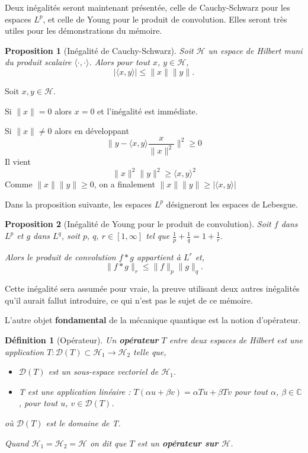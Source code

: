 \documentclass[a4paper, 12pt]{report}
\newcommand{\ra}[1][]{\overset{#1}{\rightarrow}} %
\renewcommand{\.}{\cdot} %
\theoremstyle{break}
\newtheorem{definition}{Définition}
\newtheorem{proposition}{Proposition}
\theoremstyle{remark}
\theoremstyle{proofstyle}
\begin{document}
Deux inégalités seront maintenant présentée, celle de Cauchy-Schwarz pour les espaces $L^p$, et celle de Young pour le produit de convolution. Elles seront très utiles pour les démonstrations du mémoire.

\begin{proposition}[Inégalité de Cauchy-Schwarz]
    Soit $\mathcal{H}$ un espace de Hilbert muni du produit scalaire $\langle \., \. \rangle$. Alors pour tout $x$, $y \in \mathcal{H}$,
    $$| \langle x, y \rangle | \leq \| x \| \| y \|.$$
\end{proposition}

\begin{preuve}
    Soit $x, y \in \mathcal{H}$.

    Si $\| x \| = 0$ alors $x=0$ et l'inégalité est immédiate.

    Si $\| x\| \neq 0$ alors en développant
    $$\|y-\langle x, y \rangle \frac{x}{\|x\|^2}\|^2 \geq 0$$
    Il vient
    $$\|x\|^2\|y\|^2 \geq \langle x, y \rangle ^2$$
    Comme $\|x\| \|y\| \geq 0$, on a finalement $\|x\| \|y\| \geq |\langle x, y\rangle|$
\end{preuve}

Dans la proposition suivante, les espaces $L^p$ désigneront les espaces de Lebesgue.

\begin{proposition}[Inégalité de Young pour le produit de convolution]
    Soit $f$ dans $L^p$ et $g$ dans $L^q$, soit $p, ~q,~r \in [1, \infty ]$ tel que $\frac{1}{p} + \frac{1}{q} = 1 + \frac{1}{r}.$

    Alors le produit de convolution $f * g$ appartient à $L^r$ et,
    $$\|f * g\|_r \leq \|f\|_p\|g\|_q.$$
\end{proposition}

Cette inégalité sera assumée pour vraie, la preuve utilisant deux autres inégalités qu'il aurait fallut introduire, ce qui n'est pas le sujet de ce mémoire. \vspace{5pt}

L'autre objet \textbf{fondamental} de la mécanique quantique est la notion d'opérateur.
\begin{definition}[Opérateur]
    Un \textbf{opérateur} $T$ entre deux espaces de Hilbert est une application $T : \mathcal{D}(T) \subset \mathcal{H}_1 \ra \mathcal{H}_2$ telle que,
    \begin{itemize}
        \item $\mathcal{D}(T)$ est un sous-espace vectoriel de $\mathcal{H}_1$.
        \item T est une application linéaire : $T(\alpha u + \beta v) = \alpha T u + \beta T v$ pour tout $\alpha$, $\beta \in \mathbb{C}$, pour tout $u$, $v \in \mathcal{D}(T)$.
    \end{itemize}
    où $\mathcal{D}(T)$ est le domaine de T.

    Quand $\mathcal{H}_1 = \mathcal{H}_2 = \mathcal{H}$ on dit que $T$ est un \textbf{opérateur sur $\mathcal{H}$}.
\end{definition}
\end{document}
